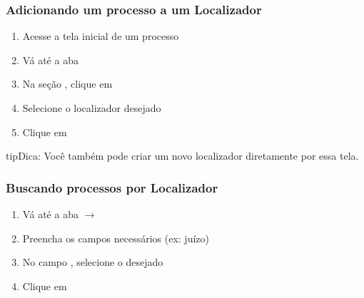\documentclass[letterpaper,10pt,brazil]{sphinxmanual}
\begin{document}
\subsubsection{Adicionando um processo a um Localizador}
\label{\detokenize{projud_50_localizador:adicionando-um-processo-a-um-localizador}}\begin{enumerate}
%
\item {} 
\sphinxAtStartPar
Acesse a tela inicial de um processo

\item {} 
\sphinxAtStartPar
Vá até a aba 

\item {} 
\sphinxAtStartPar
Na seção , clique em 

\item {} 
\sphinxAtStartPar
Selecione o localizador desejado

\item {} 
\sphinxAtStartPar
Clique em 

\end{enumerate}

\begin{sphinxadmonition}{tip}{Dica:}
\sphinxAtStartPar
Você também pode criar um novo localizador diretamente por essa tela.
\end{sphinxadmonition}


\subsubsection{Buscando processos por Localizador}
\label{\detokenize{projud_50_localizador:buscando-processos-por-localizador}}\begin{enumerate}
%
\item {} 
\sphinxAtStartPar
Vá até a aba  \(\rightarrow\) 

\item {} 
\sphinxAtStartPar
Preencha os campos necessários (ex: juízo)

\item {} 
\sphinxAtStartPar
No campo , selecione o desejado

\item {} 
\sphinxAtStartPar
Clique em 

\end{enumerate}
\end{document}
